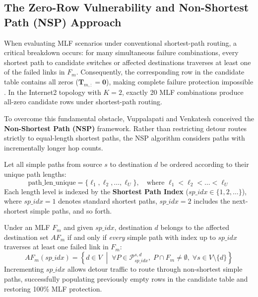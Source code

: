 \subsection{The Zero-Row Vulnerability and Non-Shortest Path (NSP) Approach}
When evaluating MLF scenarios under conventional shortest-path routing, a critical breakdown occurs: for many simultaneous failure combinations, every shortest path to candidate switches or affected destinations traverses at least one of the failed links in $F_m$. Consequently, the corresponding row in the candidate table contains all zeros ($\mathbf{T}_{m, :} = \mathbf{0}$), making complete failure protection impossible \cite{vuppalapati2025candidate}. In the Internet2 topology with $K = 2$, exactly 20 MLF combinations produce all-zero candidate rows under shortest-path routing.

To overcome this fundamental obstacle, Vuppalapati and Venkatesh \cite{vuppalapati2025candidate} conceived the \textbf{Non-Shortest Path (NSP)} framework. Rather than restricting detour routes strictly to equal-length shortest paths, the NSP algorithm considers paths with incrementally longer hop counts. 

Let all simple paths from source $s$ to destination $d$ be ordered according to their unique path lengths:
\begin{equation}
    \text{path\_len\_unique} = \{\ell_1, \ell_2, \dots, \ell_U\}, \quad \text{where } \ell_1 < \ell_2 < \dots < \ell_U
\end{equation}
Each length level is indexed by the \textbf{Shortest Path Index} ($sp\_idx \in \{1, 2, \dots\}$), where $sp\_idx = 1$ denotes standard shortest paths, $sp\_idx = 2$ includes the next-shortest simple paths, and so forth.

Under an MLF $F_m$ and given $sp\_idx$, destination $d$ belongs to the affected destination set $AF_m$ if and only if \textit{every} simple path with index up to $sp\_idx$ traverses at least one failed link in $F_m$:
\begin{equation}
    AF_m(sp\_idx) = \left\{ d \in V \;\middle|\; \forall P \in \mathcal{P}_{sp\_idx}^{s, d}, \; P \cap F_m \neq \emptyset, \; \forall s \in V \setminus \{d\} \right\}
\end{equation}
Incrementing $sp\_idx$ allows detour traffic to route through non-shortest simple paths, successfully populating previously empty rows in the candidate table and restoring 100\% MLF protection.

